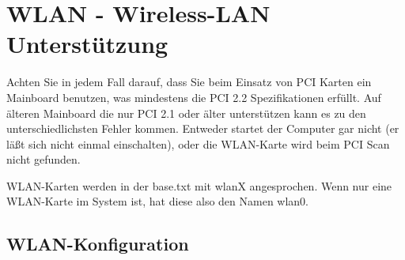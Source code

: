 {
\section {WLAN - Wireless-LAN Unterstützung}
}

Achten Sie in jedem Fall darauf, dass Sie beim Einsatz von PCI Karten
ein Mainboard benutzen, was mindestens die PCI 2.2 Spezifikationen
erfüllt. Auf älteren Mainboard die nur PCI 2.1 oder älter unterstützen
kann es zu den unterschiedlichsten Fehler kommen. Entweder startet der
Computer gar nicht (er läßt sich nicht einmal einschalten), oder die
WLAN-Karte wird beim PCI Scan nicht gefunden.

WLAN-Karten werden in der base.txt  mit wlanX angesprochen.
Wenn nur eine WLAN-Karte im System ist, hat diese also den Namen wlan0.

\subsection{WLAN-Konfiguration}

